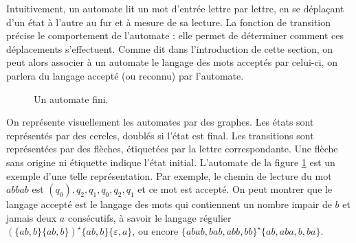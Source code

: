 Intuitivement, un automate lit un mot d'entrée lettre par lettre, en se déplaçant d'un état à l'autre au fur et à mesure de sa lecture.
La fonction de transition précise le comportement de l'automate : elle permet de déterminer comment ces déplacements s'effectuent.
Comme dit dans l'introduction de cette section, on peut alors associer à un automate le langage des mots acceptés par celui-ci, on parlera du langage accepté (ou reconnu) par l'automate.

\begin{figure}
\centering
{}
\caption{Un automate fini.}
\label{sk:fig:dfa1}
\end{figure}

On représente visuellement les automates par des graphes. Les états sont représentés par des cercles, doublés si l'état est final. Les transitions sont représentées par des flèches, étiquetées par la lettre correspondante. Une flèche sans origine ni étiquette indique l'état initial. L'automate de la figure \ref{sk:fig:dfa1} est un exemple d'une telle représentation. Par exemple, le chemin de lecture du mot $abbab$ est $(q_0),q_2,q_1,q_0,q_2,q_1$ et ce mot est accepté. On peut montrer que le langage accepté est le langage des mots qui contiennent un nombre impair de $b$ et jamais deux $a$ consécutifs, à savoir le langage régulier $(\{ab,b\}\{ab,b\})^\star \{ab,b\}\{\varepsilon,a\}$, ou encore $\{abab,bab,abb,bb\}^\star \{ab,aba,b,ba\}$.

